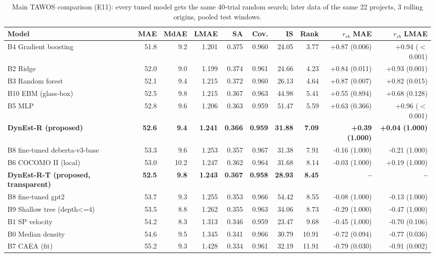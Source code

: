 \begin{table}[t]
\centering
\scriptsize
\caption{Main TAWOS comparison (E11): every tuned model gets the same 40-trial random search; later data of the same 22 projects, 3 rolling origins, pooled test windows.}
\label{tab:e11}
\begin{tabular}{lrrrrrrrrr}
\toprule
Model & MAE & MdAE & LMAE & SA & Cov. & IS & Rank & $r_{rb}$ MAE & $r_{rb}$ LMAE \\
\midrule
B4 Gradient boosting & 51.8 & 9.2 & 1.201 & 0.375 & 0.960 & 24.05 & 3.77 & +0.87 (0.006) & +0.94 ($<$0.001) \\
B2 Ridge & 52.0 & 9.0 & 1.199 & 0.374 & 0.961 & 24.66 & 4.23 & +0.84 (0.011) & +0.93 (0.001) \\
B3 Random forest & 52.1 & 9.4 & 1.215 & 0.372 & 0.960 & 26.13 & 4.64 & +0.87 (0.007) & +0.82 (0.015) \\
B10 EBM (glass-box) & 52.5 & 9.8 & 1.215 & 0.367 & 0.963 & 44.98 & 5.41 & +0.55 (0.894) & +0.68 (0.128) \\
B5 MLP & 52.8 & 9.6 & 1.206 & 0.363 & 0.959 & 51.47 & 5.59 & +0.63 (0.366) & +0.96 ($<$0.001) \\
\textbf{DynEst-R (proposed)} & \textbf{52.6} & \textbf{9.4} & \textbf{1.241} & \textbf{0.366} & \textbf{0.959} & \textbf{31.88} & \textbf{7.09} & \textbf{+0.39 (1.000)} & \textbf{+0.04 (1.000)} \\
B8 fine-tuned deberta-v3-base & 53.3 & 9.6 & 1.253 & 0.357 & 0.967 & 31.38 & 7.91 & -0.16 (1.000) & -0.21 (1.000) \\
B6 COCOMO II (local) & 53.0 & 10.2 & 1.247 & 0.362 & 0.964 & 31.68 & 8.14 & -0.03 (1.000) & +0.19 (1.000) \\
\textbf{DynEst-R-T (proposed, transparent)} & \textbf{52.5} & \textbf{9.8} & \textbf{1.243} & \textbf{0.367} & \textbf{0.958} & \textbf{28.93} & \textbf{8.45} & \textbf{--} & \textbf{--} \\
B8 fine-tuned gpt2 & 53.7 & 9.3 & 1.255 & 0.353 & 0.966 & 54.42 & 8.55 & -0.08 (1.000) & -0.13 (1.000) \\
B9 Shallow tree (depth<=4) & 53.5 & 8.8 & 1.262 & 0.355 & 0.963 & 34.06 & 8.73 & -0.29 (1.000) & -0.47 (1.000) \\
B1 SP velocity & 54.2 & 8.3 & 1.313 & 0.346 & 0.959 & 23.47 & 9.68 & -0.45 (1.000) & -0.70 (0.106) \\
B0 Median density & 54.6 & 9.5 & 1.345 & 0.341 & 0.966 & 30.79 & 10.91 & -0.72 (0.094) & -0.77 (0.036) \\
B7 CAEA (fit) & 55.2 & 9.3 & 1.428 & 0.334 & 0.961 & 32.19 & 11.91 & -0.79 (0.030) & -0.91 (0.002) \\

\end{tabular}
\end{table}
